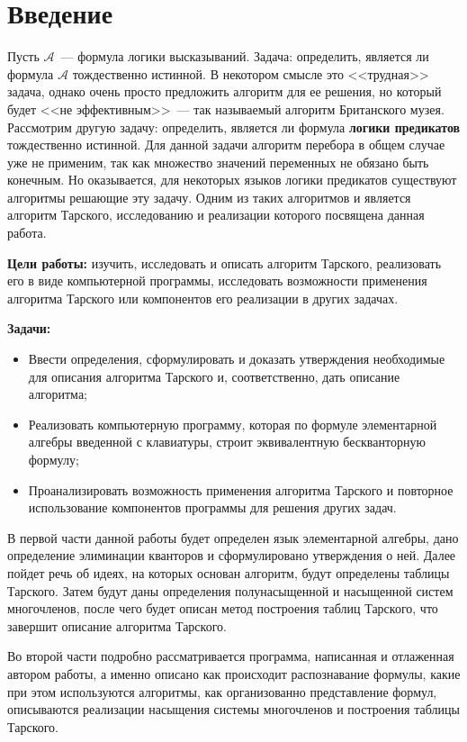 \section*{Введение}

Пусть $\mathcal{A}$~--- формула логики высказываний. Задача: определить, является ли формула $\mathcal{A}$ тождественно истинной. В некотором смысле это <<трудная>> задача, однако очень просто предложить алгоритм для ее решения, но который будет <<не эффективным>>~--- так называемый алгоритм Британского музея. Рассмотрим другую задачу: определить, является ли формула \textbf{логики предикатов} тождественно истинной. Для данной задачи алгоритм перебора в общем случае уже не применим, так как множество значений переменных не обязано быть конечным. Но оказывается, для некоторых языков логики предикатов существуют алгоритмы решающие эту задачу. Одним из таких алгоритмов и является алгоритм Тарского, исследованию и реализации которого посвящена данная работа.

\textbf{Цели работы:} изучить, исследовать и описать алгоритм Тарского, реализовать его в виде компьютерной программы, исследовать возможности применения алгоритма Тарского или компонентов его реализации в других задачах.

\textbf{Задачи:}
\begin{itemize}
	\item Ввести определения, сформулировать и доказать утверждения необходимые для описания алгоритма Тарского и, соответственно, дать описание алгоритма;
	\item Реализовать компьютерную программу, которая по формуле элементарной алгебры введенной с клавиатуры, строит эквивалентную бескванторную формулу;
	\item Проанализировать возможность применения алгоритма Тарского и повторное использование компонентов программы для решения других задач. 
\end{itemize}

В первой части данной работы будет определен язык элементарной алгебры, дано определение элиминации кванторов и сформулировано утверждения о ней. Далее пойдет речь об идеях, на которых основан алгоритм, будут определены таблицы Тарского. Затем будут даны определения полунасыщенной и насыщенной систем многочленов, после чего будет описан метод построения таблиц Тарского, что завершит описание алгоритма Тарского.

Во второй части подробно рассматривается программа, написанная и отлаженная автором работы, а именно описано как происходит распознавание формулы, какие при этом используются алгоритмы, как организованно представление формул, описываются реализации насыщения системы многочленов и построения таблицы Тарского. 